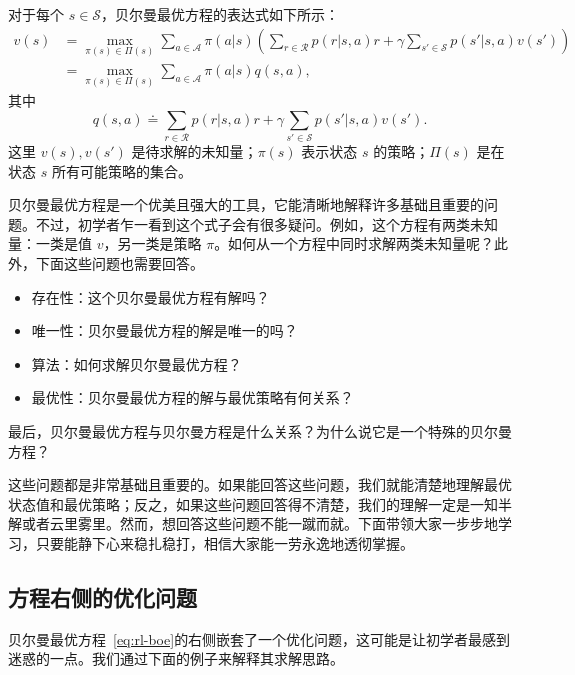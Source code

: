 对于每个 $s \in \mathcal{S}$，贝尔曼最优方程的表达式如下所示：
\begin{equation}
\begin{aligned}
  v(s) &= \max_{\pi(s) \in \varPi(s)} \sum_{a \in \mathcal{A}} \pi(a|s) \left( \sum_{r \in \mathcal{R}} p(r|s,a) r + \gamma \sum_{s' \in \mathcal{S}} p(s'|s,a) v(s') \right)\\
       &= \max_{\pi(s) \in \varPi(s)} \sum_{a \in \mathcal{A}} \pi(a|s) q(s,a),
\end{aligned}
\label{eq:rl-boe}
\end{equation}
其中
\begin{equation}
  q(s,a) \doteq \sum_{r \in \mathcal{R}} p(r|s,a) r + \gamma \sum_{s' \in \mathcal{S}} p(s'|s,a) v(s').
\end{equation}
这里 $v(s), v(s')$ 是待求解的未知量；$\pi(s)$ 表示状态 $s$ 的策略；$\varPi(s)$ 是在状态 $s$ 所有可能策略的集合。

贝尔曼最优方程是一个优美且强大的工具，它能清晰地解释许多基础且重要的问题。不过，初学者乍一看到这个式子会有很多疑问。例如，这个方程有两类未知量：一类是值 $v$，另一类是策略 $\pi$。如何从一个方程中同时求解两类未知量呢？此外，下面这些问题也需要回答。
\begin{itemize}
  \item 存在性：这个贝尔曼最优方程有解吗？
  \item 唯一性：贝尔曼最优方程的解是唯一的吗？
  \item 算法：如何求解贝尔曼最优方程？
  \item 最优性：贝尔曼最优方程的解与最优策略有何关系？
\end{itemize}

最后，贝尔曼最优方程与贝尔曼方程是什么关系？为什么说它是一个特殊的贝尔曼方程？

这些问题都是非常基础且重要的。如果能回答这些问题，我们就能清楚地理解最优状态值和最优策略；反之，如果这些问题回答得不清楚，我们的理解一定是一知半解或者云里雾里。然而，想回答这些问题不能一蹴而就。下面带领大家一步步地学习，只要能静下心来稳扎稳打，相信大家能一劳永逸地透彻掌握。

\subsection{方程右侧的优化问题}
\label{sec:rl-bellman-opt-rhs}

贝尔曼最优方程~\eqref{eq:rl-boe}的右侧嵌套了一个优化问题，这可能是让初学者最感到迷惑的一点。我们通过下面的例子来解释其求解思路。

